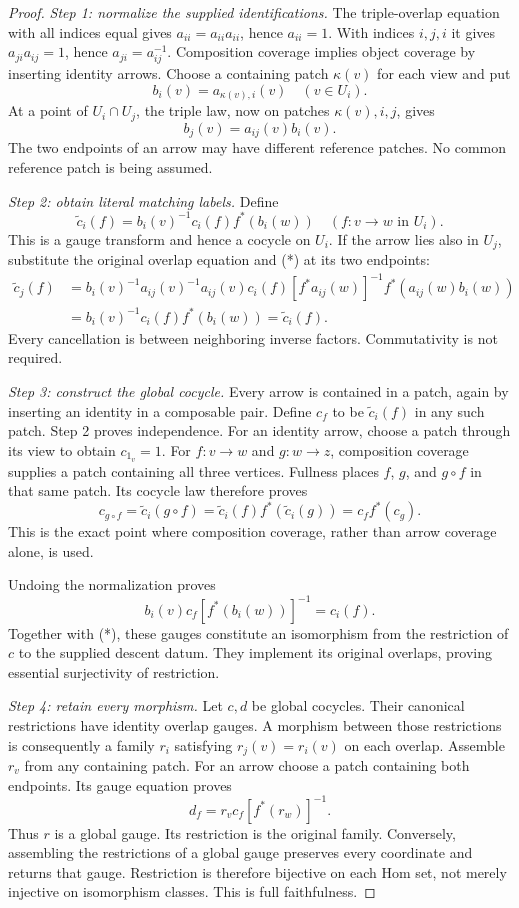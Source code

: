 \begin{proof}
\emph{Step 1: normalize the supplied identifications.} The triple-overlap equation with all indices equal gives $a_{ii}=a_{ii}a_{ii}$, hence $a_{ii}=1$. With indices $i,j,i$ it gives $a_{ji}a_{ij}=1$, hence $a_{ji}=a_{ij}^{-1}$. Composition coverage implies object coverage by inserting identity arrows. Choose a containing patch $\kappa(v)$ for each view and put
\[
 b_i(v)=a_{\kappa(v),i}(v)\quad(v\in U_i).
\]
At a point of $U_i\cap U_j$, the triple law, now on patches $\kappa(v),i,j$, gives
\[
 b_j(v)=a_{ij}(v)b_i(v).                                    \tag{*}
\]
The two endpoints of an arrow may have different reference patches. No common reference patch is being assumed.

\emph{Step 2: obtain literal matching labels.} Define
\[
 \widetilde c_i(f)=b_i(v)^{-1}c_i(f)f^*(b_i(w))
 \quad(f:v\to w\text{ in }U_i).
\]
This is a gauge transform and hence a cocycle on $U_i$. If the arrow lies also in $U_j$, substitute the original overlap equation and (*) at its two endpoints:
\[
\begin{aligned}
 \widetilde c_j(f)
 &=b_i(v)^{-1}a_{ij}(v)^{-1}
   a_{ij}(v)c_i(f)[f^*a_{ij}(w)]^{-1}
   f^*(a_{ij}(w)b_i(w))\\
 &=b_i(v)^{-1}c_i(f)f^*(b_i(w))
 =\widetilde c_i(f).
\end{aligned}
\]
Every cancellation is between neighboring inverse factors. Commutativity is not required.

\emph{Step 3: construct the global cocycle.} Every arrow is contained in a patch, again by inserting an identity in a composable pair. Define $c_f$ to be $\widetilde c_i(f)$ in any such patch. Step 2 proves independence. For an identity arrow, choose a patch through its view to obtain $c_{1_v}=1$. For $f:v\to w$ and $g:w\to z$, composition coverage supplies a patch containing all three vertices. Fullness places $f$, $g$, and $g\circ f$ in that same patch. Its cocycle law therefore proves
\[
 c_{g\circ f}=\widetilde c_i(g\circ f)
 =\widetilde c_i(f)f^*(\widetilde c_i(g))=c_ff^*(c_g).
\]
This is the exact point where composition coverage, rather than arrow coverage alone, is used.

Undoing the normalization proves
\[
 b_i(v)c_f[f^*(b_i(w))]^{-1}=c_i(f).
\]
Together with (*), these gauges constitute an isomorphism from the restriction of $c$ to the supplied descent datum. They implement its original overlaps, proving essential surjectivity of restriction.

\emph{Step 4: retain every morphism.} Let $c,d$ be global cocycles. Their canonical restrictions have identity overlap gauges. A morphism between those restrictions is consequently a family $r_i$ satisfying $r_j(v)=r_i(v)$ on each overlap. Assemble $r_v$ from any containing patch. For an arrow choose a patch containing both endpoints. Its gauge equation proves
\[
 d_f=r_vc_f[f^*(r_w)]^{-1}.
\]
Thus $r$ is a global gauge. Its restriction is the original family. Conversely, assembling the restrictions of a global gauge preserves every coordinate and returns that gauge. Restriction is therefore bijective on each Hom set, not merely injective on isomorphism classes. This is full faithfulness.


\end{proof}
